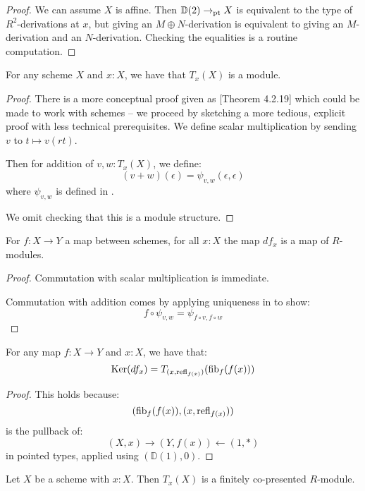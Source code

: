 \begin{proof}
We can assume $X$ is affine. Then $\mathbb{D}(2)\to_{\mathrm{pt}} X$ is equivalent to the type of $R^2$-derivations at $x$, but giving an $M\oplus N$-derivation is equivalent to giving an $M$-derivation and an $N$-derivation. Checking the equalities is a routine computation.
\end{proof}

\begin{lemma}
For any scheme $X$ and $x:X$, we have that $T_x(X)$ is a module.
\end{lemma}

\begin{proof}
There is a more conceptual proof given as \cite{david-orbifolds}[Theorem 4.2.19] which could be made to work with schemes -- we proceed by sketching a more tedious, explicit proof with less technical prerequisites.
We define scalar multiplication by sending $v$ to $t\mapsto v(rt)$.

Then for addition of $v,w:T_x(X)$, we define:
\[(v+w)(\epsilon) = \psi_{v,w}(\epsilon,\epsilon)\]
where $\psi_{v,w}$ is defined in .

We omit checking that this is a module structure.
\end{proof}

\begin{lemma}
For $f:X\to Y$ a map between schemes, for all $x:X$ the map $df_x$ is a map of $R$-modules.
\end{lemma}

\begin{proof}
Commutation with scalar multiplication is immediate.

Commutation with addition comes by applying uniqueness in  to show:
\[f\circ \psi_{v,w} = \psi_{f\circ v,f\circ w}\]
\end{proof}

\begin{lemma}\label{kernel-is-tangent-of-fibers}
For any map $f:X\to Y$ and $x:X$, we have that:
\[
\mathrm{Ker}(df_x) = T_{(x,\mathrm{refl}_{f(x)})}(\mathrm{fib}_f(f(x)))
\]
\end{lemma}

\begin{proof}
This holds because:
\[
(\mathrm{fib}_f(f(x)),(x,\mathrm{refl}_{f(x)}))
\]
is the pullback of:
\[
(X,x) \to (Y,f(x)) \leftarrow (1,*)
\]
in pointed types, applied using $(\mathbb{D}(1),0)$.
\end{proof}

\begin{lemma}\label{tangent-finite-copresented}
Let $X$ be a scheme with $x : X$. Then $T_x(X)$ is a finitely
co-presented $R$-module.
\end{lemma}

